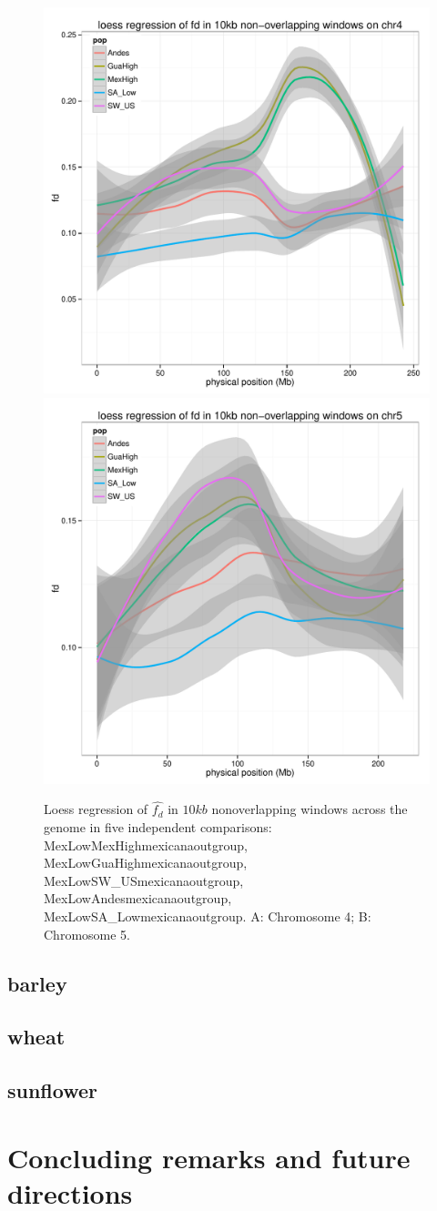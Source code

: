 \documentclass[11pt]{article}
\begin{document}
\begin{figure}[b]
\centering
\includegraphics[width=.45\textwidth]{FigsAndTables/fdTrackChr4AllPop}
\hspace{0.05\textwidth} 
\includegraphics[width=.45\textwidth]{FigsAndTables/fdTrackChr5AllPop}
\caption{Loess regression of $\hat{f_{d}}$ in $10kb$ non\-overlapping windows across the genome in   five independent comparisons: MexLow\-MexHigh\-mexicana\-outgroup, MexLow\-GuaHigh\-mexicana\-outgroup, MexLow\-SW\_US\-mexicana\-outgroup, MexLow\-Andes\-mexicana\-outgroup, MexLow\-SA_Low\-mexicana\-outgroup. A: Chromosome 4; B: Chromosome 5. \label{fig:fd}}
\end{figure}
 

\subsection{barley}
\subsection{wheat}
\subsection{sunflower}

\section{Concluding remarks and future directions}



%
% 

\end{document}
